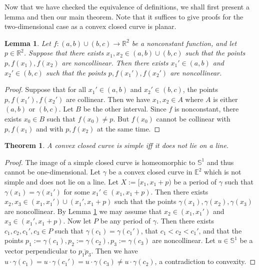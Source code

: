 \documentclass{amsart}
\newtheorem{lemma}[proposition]{Lemma}
\newtheorem{theorem}[proposition]{Theorem}
\theoremstyle{definition}
\theoremstyle{remark}
\begin{document}
Now that we have checked the equivalence of definitions,
we shall first present a lemma and then our main theorem.
Note that it suffices to give proofs for the two-dimensional case
as a convex closed curve is planar.

\begin{lemma}
    \label{lem}
    Let $f:(a,b)\cup(b,c)\to\mathbb{R}^2$ be a
    nonconstant function, and let $p\in\mathbb{R}^2$.
    Suppose that there exists $x_1,x_2\in(a,b)\cup(b,c)$ such that
    the points $p,f(x_1),f(x_2)$ are noncollinear.
    Then there exists $x_1'\in(a,b)$ and $x_2'\in(b,c)$ such that
    the points $p,f(x_1'),f(x_2')$ are noncollinear.
\end{lemma}

\begin{proof}
    Suppose that for all $x_1'\in(a,b)$ and $x_2'\in(b,c)$,
    the points $p,f(x_1'),f(x_2')$ are collinear.
    Then we have $x_1,x_2\in A$ where
    $A$ is either $(a,b)$ or $(b,c)$. Let $B$ be the other interval.
    Since $f$ is nonconstant, there exists $x_0\in B$
    such that $f(x_0)\ne p$. But $f(x_0)$ cannot be collinear
    with $p,f(x_1)$ and with $p,f(x_2)$ at the same time.
\end{proof}

\begin{theorem}
    \label{thm:main}
    A convex closed curve is simple iff it does not lie on a line.
\end{theorem}

\begin{proof}
    The image of a simple closed curve is homeomorphic to
    $\mathbb{S}^1$ and thus cannot be one-dimensional.
    Let $\gamma$ be a convex closed curve in $\mathbb{E}^2$
    which is not simple and does not lie on a line.
    Let $X:=[x_1,x_1+p)$ be a period of $\gamma$ such that
    $\gamma(x_1)=\gamma(x_1')$ for some $x_1'\in(x_1,x_1+p)$.
    Then there exists $x_2,x_3\in(x_1,x_1')\cup(x_1',x_1+p)$
    such that the points $\gamma(x_1),\gamma(x_2),\gamma(x_3)$ are
    noncollinear. By Lemma \ref{lem} we may assume that
    $x_2\in(x_1,x_1')$ and $x_3\in(x_1',x_1+p)$.
    Now let $P$ be any period of $\gamma$. Then there exists
    $c_1,c_2,c_1',c_3\in P$ such that $\gamma(c_1)=\gamma(c_1')$,
    that $c_1<c_2<c_1'$, and that the points
    $p_1:=\gamma(c_1),p_2:=\gamma(c_2),p_3:=\gamma(c_3)$ are noncollinear.
    Let $u\in\mathbb{S}^1$ be a vector perpendicular to
    $\overline{p_1p_3}$. Then we have
    $u\cdot\gamma(c_1)=u\cdot\gamma(c_1')=u\cdot\gamma(c_3)
        \ne u\cdot\gamma(c_2)$, a contradiction to convexity.
\end{proof}
\end{document}
